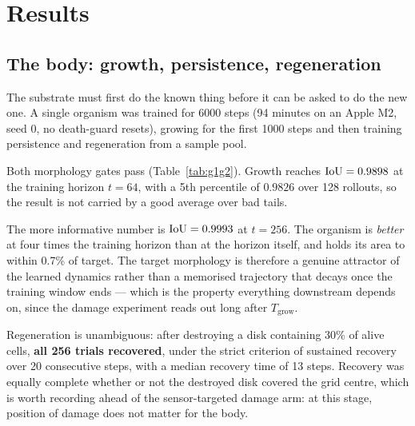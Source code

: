 \section{Results}
\label{sec:results}

\subsection{The body: growth, persistence, regeneration}
\label{sec:results-morph}

The substrate must first do the known thing before it can be asked to do the new
one. A single organism was trained for 6000 steps (94 minutes on an Apple M2,
seed 0, no death-guard resets), growing for the first 1000 steps and then
training persistence and regeneration from a sample pool.

Both morphology gates pass (Table~\ref{tab:g1g2}). Growth reaches
$\mathrm{IoU} = 0.9898$ at the training horizon $t=64$, with a 5th percentile of
$0.9826$ over 128 rollouts, so the result is not carried by a good average over
bad tails.

The more informative number is $\mathrm{IoU} = 0.9993$ at $t=256$. The organism is
\emph{better} at four times the training horizon than at the horizon itself, and
holds its area to within 0.7\% of target. The target morphology is therefore a
genuine attractor of the learned dynamics rather than a memorised trajectory that
decays once the training window ends --- which is the property everything
downstream depends on, since the damage experiment reads out long after $T_{\mathrm{grow}}$.

Regeneration is unambiguous: after destroying a disk containing 30\% of alive
cells, \textbf{all 256 trials recovered}, under the strict criterion of sustained
recovery over 20 consecutive steps, with a median recovery time of 13 steps.
Recovery was equally complete whether or not the destroyed disk covered the grid
centre, which is worth recording ahead of the sensor-targeted damage arm: at this
stage, position of damage does not matter for the body.

